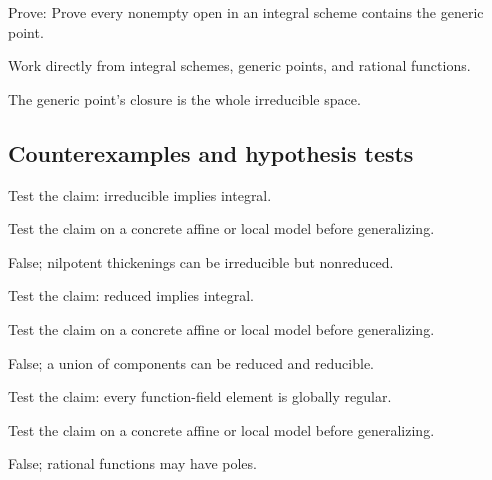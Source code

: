 \begin{exercise}\label{exr:vi27-expand-09}
Prove: Prove every nonempty open in an integral scheme contains the generic point.
\end{exercise}
\begin{hint}
Work directly from integral schemes, generic points, and rational functions.
\end{hint}
\begin{solution}
The generic point's closure is the whole irreducible space.
\end{solution}

\subsection*{Counterexamples and hypothesis tests}

\begin{exercise}\label{exr:vi27-expand-10}
Test the claim: irreducible implies integral.
\end{exercise}
\begin{hint}
Test the claim on a concrete affine or local model before generalizing.
\end{hint}
\begin{solution}
False; nilpotent thickenings can be irreducible but nonreduced.
\end{solution}

\begin{exercise}\label{exr:vi27-expand-11}
Test the claim: reduced implies integral.
\end{exercise}
\begin{hint}
Test the claim on a concrete affine or local model before generalizing.
\end{hint}
\begin{solution}
False; a union of components can be reduced and reducible.
\end{solution}

\begin{exercise}\label{exr:vi27-expand-12}
Test the claim: every function-field element is globally regular.
\end{exercise}
\begin{hint}
Test the claim on a concrete affine or local model before generalizing.
\end{hint}
\begin{solution}
False; rational functions may have poles.
\end{solution}

